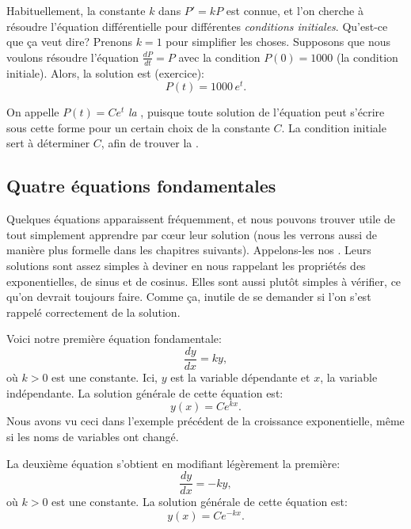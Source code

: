 Habituellement, la constante $k$ dans $P' = kP$ est connue, et l'on cherche à résoudre
l'équation différentielle pour différentes \emph{conditions initiales}.
Qu'est-ce que ça veut dire?
Prenons $k=1$ pour simplifier les choses.
Supposons que nous voulons résoudre l'équation $\frac{dP}{dt} = P$
avec la condition $P(0) = 1000$ (la condition initiale).
Alors, la solution est (exercice):
\begin{equation*}
	P(t) = 1000 \, e^t .
\end{equation*}

On appelle $P(t) = C e^t$ \emph{la },
puisque toute solution de l'équation peut s'écrire sous cette forme pour un certain choix de la constante $C$.
La condition initiale sert à déterminer $C$, afin de trouver la
\emph{}.

\subsection{Quatre équations fondamentales} \label{subsection:fourfundamental}

Quelques équations apparaissent fréquemment, et nous pouvons trouver utile de tout simplement apprendre par c{\oe}ur leur solution
(nous les verrons aussi de manière plus formelle dans les chapitres suivants).
Appelons-les nos .
Leurs solutions sont assez simples à deviner
en nous rappelant les propriétés des exponentielles, de sinus et de cosinus.
Elles sont aussi plutôt simples à vérifier, ce qu'on devrait toujours faire.
Comme ça, inutile de se demander si l'on s'est rappelé correctement de la solution.

\medskip

Voici notre première équation fondamentale:
\begin{equation*}
	\frac{dy}{dx} = k y,
\end{equation*}
où $k > 0$ est une constante.
Ici, $y$ est la variable dépendante et $x$, la variable indépendante.
La solution générale de cette équation est:
\begin{equation*}
	y(x) = C e^{kx} .
\end{equation*}
Nous avons vu ceci dans l'exemple précédent de la croissance exponentielle, même si les noms de variables ont changé.

\medskip

La deuxième équation s'obtient en modifiant légèrement la première:
\begin{equation*}
	\frac{dy}{dx} = -k y,
\end{equation*}
où $k > 0$ est une constante. La solution générale de cette équation est:
\begin{equation*}
	y(x) = C e^{-kx}.
\end{equation*}

